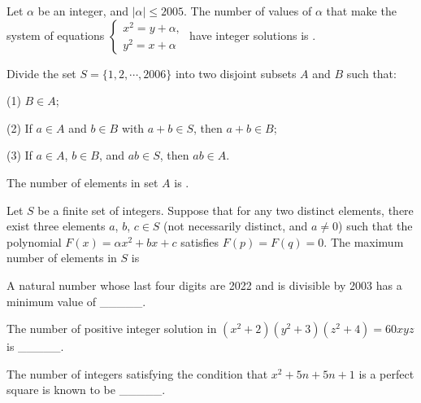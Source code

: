 \begin{problem}\label{Alg42}
Let $\alpha$ be an integer, and $|\alpha|\leq2005$. The number of values of $\alpha$ that make the system of equations $\begin{cases}x^{2}=y+\alpha,\\y^{2}=x+\alpha\end{cases}$ have integer solutions is \underline{\hspace{2cm}}.	
\end{problem}


\begin{problem}\label{Alg43}
Divide the set $S=\{1,2,\cdots,2006\}$ into two disjoint subsets $A$ and $B$ such that:

(1) $B \in A$;

(2) If $a\in A$ and $b\in B$ with $a+b\in S$, then $a+b\in B$;

(3) If $a\in A$, $b\in B$, and $a b\in S$, then $a b\in A$.

The number of elements in set $A$ is \underline{\hspace{2cm}}.	
\end{problem}




\begin{problem}\label{Alg44}
Let $S$ be a finite set of integers. Suppose that for any two distinct elements, there exist three elements $a$, $b$, $c \in S$ (not necessarily distinct, and $a \neq 0$) such that the polynomial $F(x) = \alpha x^2 + bx + c$ satisfies $F(p) = F(q) = 0$. The maximum number of elements in $S$ is \underline{\hspace{2cm}}
\end{problem}


\begin{problem}\label{Number_Theory45}
A natural number whose last four digits are 2022 and is divisible by 2003 has a minimum value of \_\_\_\_\_.
\end{problem}


\begin{problem}\label{Number_Theory46}
The number of positive integer solution in $\left(x^{2}+2\right)\left(y^{2}+3\right)\left(z^{2}+4\right)=60 x y z $ is \_\_\_\_\_.
\end{problem}


\begin{problem}\label{Number_Theory47}
The number of integers satisfying the condition that $x^2+5n+5n+1$ is a perfect square is known to be \_\_\_\_\_.
\end{problem}


